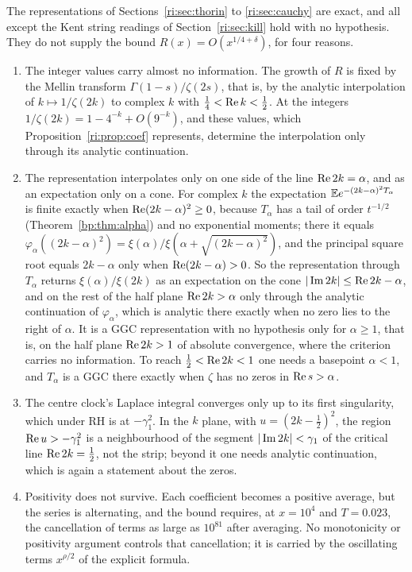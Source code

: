 The representations of Sections~\ref{ri:sec:thorin} to \ref{ri:sec:cauchy} are exact, and all except the Kent string readings of Section~\ref{ri:sec:kill} hold with no hypothesis. They do not supply the bound $R(x)=O(x^{1/4+\delta})$, for four reasons.
\begin{enumerate}
\item The integer values carry almost no information. The growth of $R$ is fixed by the Mellin transform $\Gamma(1-s)/\zeta(2s)$, that is, by the analytic interpolation of $k\mapsto1/\zeta(2k)$ to complex $k$ with $\frac14<\operatorname{Re} k<\frac12$. At the integers $1/\zeta(2k)=1-4^{-k}+O(9^{-k})$, and these values, which Proposition~\ref{ri:prop:coef} represents, determine the interpolation only through its analytic continuation.
\item The representation interpolates only on one side of the line $\operatorname{Re}2k=\alpha$, and as an expectation only on a cone. For complex $k$ the expectation $\mathbb{E} e^{-(2k-\alpha)^2T_\alpha}$ is finite exactly when $\operatorname{Re}(2k-\alpha)^2\ge0$, because $T_\alpha$ has a tail of order $t^{-1/2}$ (Theorem~\ref{bp:thm:alpha}) and no exponential moments; there it equals $\varphi_\alpha((2k-\alpha)^2)=\xi(\alpha)/\xi(\alpha+\sqrt{(2k-\alpha)^2})$, and the principal square root equals $2k-\alpha$ only when $\operatorname{Re}(2k-\alpha)>0$. So the representation through $T_\alpha$ returns $\xi(\alpha)/\xi(2k)$ as an expectation on the cone $|\operatorname{Im}2k|\le\operatorname{Re}2k-\alpha$, and on the rest of the half plane $\operatorname{Re}2k>\alpha$ only through the analytic continuation of $\varphi_\alpha$, which is analytic there exactly when no zero lies to the right of $\alpha$. It is a GGC representation with no hypothesis only for $\alpha\ge1$, that is, on the half plane $\operatorname{Re}2k>1$ of absolute convergence, where the criterion carries no information. To reach $\frac12<\operatorname{Re}2k<1$ one needs a basepoint $\alpha<1$, and $T_\alpha$ is a GGC there exactly when $\zeta$ has no zeros in $\operatorname{Re} s>\alpha$.
\item The centre clock's Laplace integral converges only up to its first singularity, which under RH is at $-\gamma_1^2$. In the $k$ plane, with $u=(2k-\frac12)^2$, the region $\operatorname{Re} u>-\gamma_1^2$ is a neighbourhood of the segment $|\operatorname{Im}2k|<\gamma_1$ of the critical line $\operatorname{Re}2k=\frac12$, not the strip; beyond it one needs analytic continuation, which is again a statement about the zeros.
\item Positivity does not survive. Each coefficient becomes a positive average, but the series is alternating, and the bound requires, at $x=10^4$ and $T=0.023$, the cancellation of terms as large as $10^{81}$ after averaging. No monotonicity or positivity argument controls that cancellation; it is carried by the oscillating terms $x^{\rho/2}$ of the explicit formula.
\end{enumerate}

